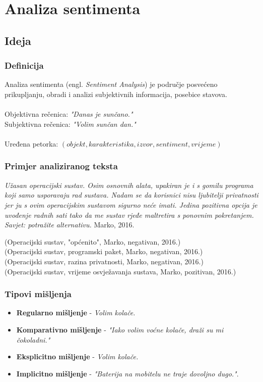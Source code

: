 \documentclass[utf8]{beamer}
\begin{document}
\section{Analiza sentimenta}

\subsection{Ideja}
\begin{frame}
\frametitle{Definicija}
Analiza sentimenta (engl. \textit{Sentiment Analysis}) je područje posvećeno 
prikupljanju, obradi i analizi subjektivnih informacija, posebice stavova. \\~\\

Objektivna rečenica: \textit{"Danas je sunčano."} \\
Subjektivna rečenica: \textit{"Volim sunčan dan."} \\~\\

Uređena petorka: $(objekt, karakteristika, izvor, sentiment, vrijeme)$
\end{frame}

\begin{frame}
\frametitle{Primjer analiziranog teksta}
{\it
Užasan operacijski sustav. 
Osim osnovnih alata, upakiran je i s gomilu programa koji samo usporavaju rad sustava.
Nadam se da korisnici nisu ljubitelji privatnosti jer ju s ovim operacijskim sustavom
sigurno neće imati. 
Jedina pozitivna opcija je uvođenje radnih sati tako da me sustav rjeđe maltretira s 
ponovnim pokretanjem.
Savjet: potražite alternativu.
} Marko, 2016.

\begin{center}
(Operacijski sustav, "općenito", Marko, negativan, 2016.)\\
(Operacijski sustav, programski paket, Marko, negativan, 2016.)\\
(Operacijski sustav, razina privatnosti, Marko, negativan, 2016.)\\
(Operacijski sustav, vrijeme osvježavanja sustava, Marko, pozitivan, 2016.) \\
\end{center}
\end{frame}

\begin{frame}
\frametitle{Tipovi mišljenja}
\begin{itemize}
\item \textbf{Regularno mišljenje} - \textit{Volim kolače.}
\item \textbf{Komparativno mišljenje} - \textit{"Iako volim voćne kolače, draži su mi čokoladni."}
\item \textbf{Eksplicitno mišljenje} - \textit{Volim kolače.}
\item \textbf{Implicitno mišljenje} - \textit{"Baterija na mobitelu ne traje dovoljno dugo."}.
\end{itemize}
\end{frame}
\end{document}
